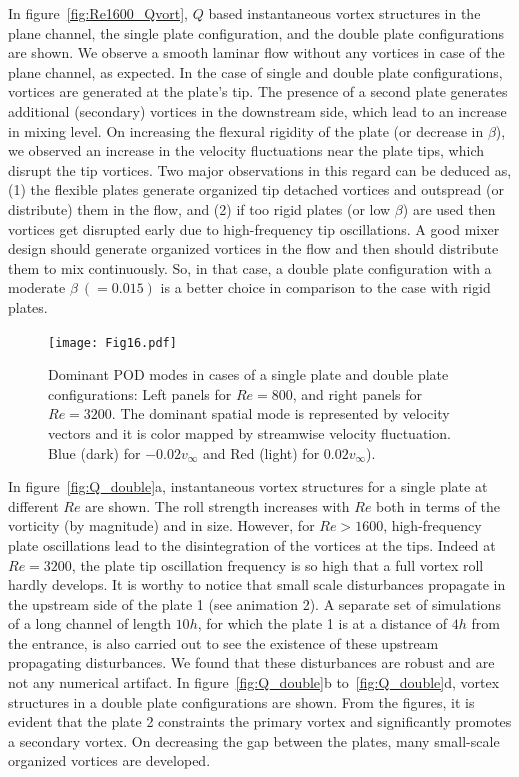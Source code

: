 \documentclass[aps,pre,twocolumn,aps,longbibliography]{revtex4-1}
\begin{document}
	
	In figure~\ref{fig:Re1600_Qvort}, $Q$ based instantaneous vortex structures in the plane channel, the single plate configuration, and the double plate configurations are shown. We observe a smooth laminar flow without any vortices in case of the plane channel, as expected. In the case of single and double plate configurations, vortices are generated at the plate's tip. The presence of a second plate generates additional (secondary) vortices in the downstream side, which lead to an increase in mixing level. On increasing the flexural rigidity of the plate (or decrease in $\beta$), we observed an increase in the velocity fluctuations near the plate tips, which disrupt the tip vortices. Two major observations in this regard can be deduced as, (1) the flexible plates generate organized tip detached vortices and outspread (or distribute) them in the flow, and (2) if too rigid plates (or low $\beta$) are used then vortices get disrupted early due to high-frequency tip oscillations. A good mixer design should generate organized vortices in the flow and then should distribute them to mix continuously. So, in that case, a double plate configuration with a moderate $\beta~(=0.015)$ is a better choice in comparison to the case with rigid plates.
	
	\begin{figure}
		\begin{minipage}[c]{0.85\linewidth}
			\texttt{[image: Fig16.pdf]} 
		\end{minipage} 
		\caption{Dominant POD modes in cases of a single plate and double plate configurations: Left panels for $Re=800$, and right panels for $Re=3200$. The dominant spatial mode is represented by velocity vectors and it is color mapped by streamwise velocity fluctuation. Blue (dark) for $-0.02 {v_{\infty}}$ and Red (light) for $0.02{v_{\infty}}$).}
		\label{fig:pod_analysis}
	\end{figure}
	
	In figure~\ref{fig:Q_double}a, instantaneous vortex structures for a single plate at different $Re$ are shown. The roll strength increases with $Re$ both in terms of the vorticity (by magnitude) and in size. However, for $Re>1600$, high-frequency plate oscillations lead to the disintegration of the vortices at the tips. Indeed at $Re=3200$, the plate tip oscillation frequency is so high that a full vortex roll hardly develops. It is worthy to notice that small scale disturbances propagate in the upstream side of the plate 1 (see animation 2). A separate set of simulations of a long channel of length $10h$, for which the plate 1 is at a distance of $4h$ from the entrance, is also carried out to see the existence of these upstream propagating disturbances. We found that these disturbances are robust and are not any numerical artifact. In figure~\ref{fig:Q_double}b to~\ref{fig:Q_double}d, vortex structures in a double plate configurations are shown. From the figures, it is evident that the plate 2 constraints the primary vortex and significantly promotes a secondary vortex. On decreasing the gap between the plates, many small-scale organized vortices are developed.
	
\end{document}
